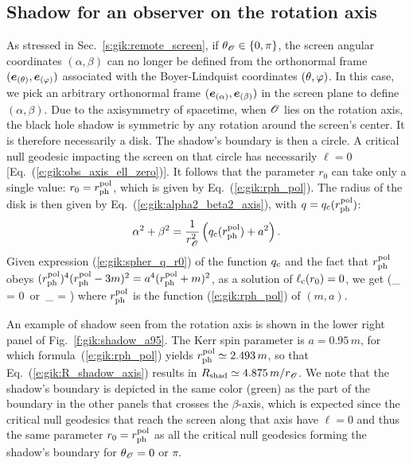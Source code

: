 \subsection{Shadow for an observer on the rotation axis} \label{s:gik:shadow_rot_axis}

As stressed in Sec.~\ref{s:gik:remote_screen}, if $\theta_{\mathscr{O}}\in\{0,\pi\}$,
the screen angular coordinates $(\alpha,\beta)$ can no longer be defined from the
orthonormal frame
$(\bm{e}_{(\theta)}, \bm{e}_{(\varphi)})$ associated with the Boyer-Lindquist coordinates $(\theta,\varphi)$.
In this case, we pick an arbitrary orthonormal
frame $(\bm{e}_{(\alpha)}, \bm{e}_{(\beta)})$ in the screen plane to define
$(\alpha,\beta)$.
Due to the axisymmetry of spacetime, when $\mathscr{O}$ lies on the rotation axis, the black hole
shadow is symmetric by any rotation around the screen's center. It
is therefore necessarily a disk. The shadow's boundary is then a circle.
A critical null geodesic impacting the screen on that circle
has necessarily $\ell=0$ [Eq.~(\ref{e:gik:obs_axis_ell_zero})]. It follows
that the parameter $r_0$ can take only a single value:
$r_0 = r_{\rm ph}^{\rm pol}$, which is
given by Eq.~(\ref{e:gik:rph_pol}). The radius of the disk is
then given by Eq.~(\ref{e:gik:alpha2_beta2_axis}), with $q=q_{\rm c}(r_{\rm ph}^{\rm pol})$:
\[
    \alpha^2 + \beta^2 = \frac{1}{r_{\mathscr{O}}^2} \left( q_{\rm c}(r_{\rm ph}^{\rm pol}) + a^2\right) .
\]
Given expression (\ref{e:gik:spher_q_r0}) of the function $q_{\rm c}$
and the fact that $r_{\rm ph}^{\rm pol}$ obeys
$(r_{\rm ph}^{\rm pol})^4 (r_{\rm ph}^{\rm pol} - 3m)^2 = a^4 (r_{\rm ph}^{\rm pol} + m)^2$,
as a solution of $\ell_{\rm c}(r_0) = 0$, we get
\be \label{e:gik:R_shadow_axis}
    \qquad (\th_{\Obs} = 0\ \mbox{or}\  \th_{\Obs} = \pi)
\ee
where $r_{\rm ph}^{\rm pol}$ is the function (\ref{e:gik:rph_pol}) of $(m, a)$.

\begin{example}
An example of shadow seen from the rotation axis is shown in the lower right panel of
Fig.~\ref{f:gik:shadow_a95}. The Kerr spin parameter is $a=0.95\, m$, for which
formula~(\ref{e:gik:rph_pol})
yields $r_{\rm ph}^{\rm pol} \simeq 2.493\, m$,
so that Eq.~(\ref{e:gik:R_shadow_axis}) results in
$R_{\rm shad} \simeq 4.875\, m / r_{\mathscr{O}}$.
We note that the shadow's boundary is depicted in the same color (green)
as the part of the boundary in the other panels that crosses the $\beta$-axis,
which is expected since the critical null geodesics that reach the screen along
that axis have $\ell=0$ and thus the same parameter $r_0 = r_{\rm ph}^{\rm pol}$
as all the critical null geodesics forming the shadow's boundary for $\theta_{\mathscr{O}} = 0$
or $\pi$.
\end{example}

